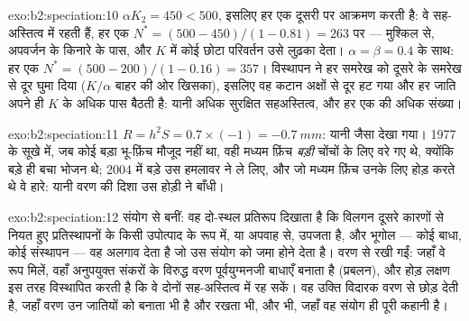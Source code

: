 \begin{solution}{exo:b2:speciation:10}
$\alpha K_2 = 450 < 500$, इसलिए हर एक दूसरी पर आक्रमण करती है: वे सह-अस्तित्व में रहती हैं,
हर एक $N^{*} = (500 - 450)/(1 - 0.81) = 263$ पर --- मुश्किल से, अपवर्जन के
किनारे के पास, और $K$ में कोई छोटा परिवर्तन उसे लुढ़का देता।
$\alpha = \beta = 0.4$ के साथ: हर एक $N^{*} = (500 - 200)/(1 - 0.16) = 357$।
विस्थापन ने हर समरेख को दूसरे के समरेख से दूर घुमा दिया ($K/\alpha$
बाहर की ओर खिसका), इसलिए वह कटान अक्षों से दूर हट गया और हर
जाति अपने ही $K$ के अधिक पास बैठती है: यानी अधिक सुरक्षित सहअस्तित्व,
और हर एक की अधिक संख्या।
\end{solution}

\begin{solution}{exo:b2:speciation:11}
$R = h^{2}S = 0.7\times(-1) = \qty{-0.7}{mm}$: यानी जैसा देखा गया।
1977 के सूखे में, जब कोई बड़ा भू-फ़िंच मौजूद नहीं था, वही मध्यम
फ़िंच \emph{बड़ी} चोंचों के लिए वरे गए थे, क्योंकि बड़े  ही
बचा भोजन थे; 2004 में बड़े  उस
हमलावर ने ले लिए, और जो मध्यम फ़िंच उनके लिए होड़ करते थे वे हारे: यानी
वरण की दिशा उस होड़ी ने बाँधी।
\end{solution}

\begin{solution}{exo:b2:speciation:12}
संयोग से बनीं: वह दो-स्थल प्रतिरूप दिखाता है कि विलगन दूसरे कारणों से
नियत हुए प्रतिस्थापनों के किसी उपोत्पाद के रूप में, या अपवाह से, उपजता है,
और भूगोल --- कोई बाधा, कोई संस्थापन --- वह अलगाव देता है
जो उस संयोग को जमा होने देता है। वरण से रखी गईं: जहाँ वे
रूप मिलें, वहाँ अनुपयुक्त संकरों के विरुद्ध वरण पूर्वयुग्मनजी
बाधाएँ बनाता है (प्रबलन), और होड़ लक्षण इस तरह विस्थापित करती है
कि वे दोनों सह-अस्तित्व में रह सकें। वह उक्ति विदारक वरण से 
छोड़ देती है, जहाँ वरण उन जातियों को बनाता भी है और रखता भी,
और  भी, जहाँ वह संयोग ही पूरी कहानी है।
\end{solution}

